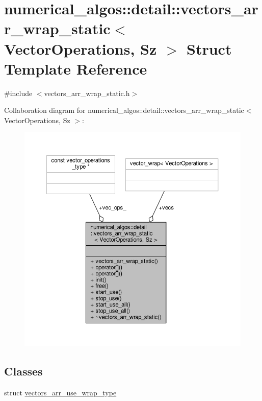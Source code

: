 \hypertarget{structnumerical__algos_1_1detail_1_1vectors__arr__wrap__static}{\section{numerical\-\_\-algos\-:\-:detail\-:\-:vectors\-\_\-arr\-\_\-wrap\-\_\-static$<$ Vector\-Operations, Sz $>$ Struct Template Reference}
\label{structnumerical__algos_1_1detail_1_1vectors__arr__wrap__static}
}


{\ttfamily \#include $<$vectors\-\_\-arr\-\_\-wrap\-\_\-static.\-h$>$}



Collaboration diagram for numerical\-\_\-algos\-:\-:detail\-:\-:vectors\-\_\-arr\-\_\-wrap\-\_\-static$<$ Vector\-Operations, Sz $>$\-:
\nopagebreak
\begin{figure}[H]
\begin{center}
\leavevmode
\includegraphics[width=350pt]{structnumerical__algos_1_1detail_1_1vectors__arr__wrap__static__coll__graph}
\end{center}
\end{figure}
\subsection*{Classes}
\begin{DoxyCompactItemize}
\item 
struct \hyperlink{structnumerical__algos_1_1detail_1_1vectors__arr__wrap__static_1_1vectors__arr__use__wrap__type}{vectors\-\_\-arr\-\_\-use\-\_\-wrap\-\_\-type}
\end{DoxyCompactItemize}
